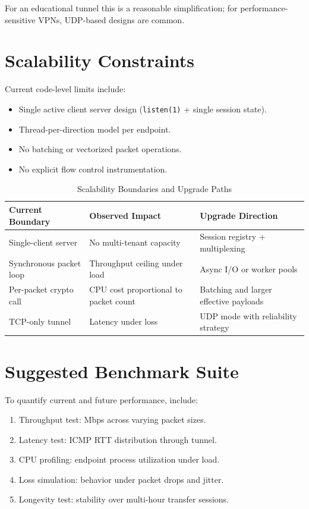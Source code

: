 For an educational tunnel this is a reasonable simplification; for performance-sensitive VPNs, UDP-based designs are common.

\section{Scalability Constraints}
Current code-level limits include:
\begin{itemize}[leftmargin=2em]
\item Single active client server design (\texttt{listen(1)} + single session state).
\item Thread-per-direction model per endpoint.
\item No batching or vectorized packet operations.
\item No explicit flow control instrumentation.
\end{itemize}

\begin{table}[H]
\centering
\caption{Scalability Boundaries and Upgrade Paths}
\begin{tabular}{p{}p{}p{}}
\toprule
\textbf{Current Boundary} & \textbf{Observed Impact} & \textbf{Upgrade Direction} \\
\midrule
Single-client server & No multi-tenant capacity & Session registry + multiplexing \\
Synchronous packet loop & Throughput ceiling under load & Async I/O or worker pools \\
Per-packet crypto call & CPU cost proportional to packet count & Batching and larger effective payloads \\
TCP-only tunnel & Latency under loss & UDP mode with reliability strategy \\
\bottomrule
\end{tabular}
\end{table}

\section{Suggested Benchmark Suite}
To quantify current and future performance, include:
\begin{enumerate}[leftmargin=2em]
\item Throughput test: Mbps across varying packet sizes.
\item Latency test: ICMP RTT distribution through tunnel.
\item CPU profiling: endpoint process utilization under load.
\item Loss simulation: behavior under packet drops and jitter.
\item Longevity test: stability over multi-hour transfer sessions.
\end{enumerate}

